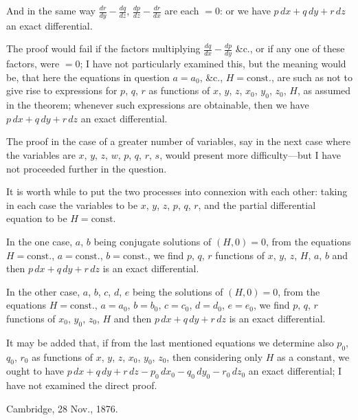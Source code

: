 \documentclass[11pt,a4paper]{book}
\begin{document}
And in the same way $\frac{dr}{dy} - \frac{dq}{dz}$, $\frac{dp}{dz} - \frac{dr}{dx}$ are each $= 0$: or we have $p\,dx + q\,dy + r\,dz$ an exact differential.

The proof would fail if the factors multiplying $\frac{dq}{dx} - \frac{dp}{dy}$ \&c., or if any one of these factors, were $= 0$; I have not particularly examined this, but the meaning would be, that here the equations in question $a = a_0$, \&c., $H = \text{const.}$, are such as not to give rise to expressions for $p$, $q$, $r$ as functions of $x$, $y$, $z$, $x_0$, $y_0$, $z_0$, $H$, as assumed in the theorem; whenever such expressions are obtainable, then we have $p\,dx + q\,dy + r\,dz$ an exact differential.

The proof in the case of a greater number of variables, say in the next case where the variables are $x$, $y$, $z$, $w$, $p$, $q$, $r$, $s$, would present more difficulty---but I have not proceeded further in the question.

It is worth while to put the two processes into connexion with each other: taking in each case the variables to be $x$, $y$, $z$, $p$, $q$, $r$, and the partial differential equation to be $H = \text{const.}$

In the one case, $a$, $b$ being conjugate solutions of $(H, 0) = 0$, from the equations $H = \text{const.}$, $a = \text{const.}$, $b = \text{const.}$, we find $p$, $q$, $r$ functions of $x$, $y$, $z$, $H$, $a$, $b$ and then $p\,dx + q\,dy + r\,dz$ is an exact differential.

In the other case, $a$, $b$, $c$, $d$, $e$ being the solutions of $(H, 0) = 0$, from the equations $H = \text{const.}$, $a = a_0$, $b = b_0$, $c = c_0$, $d = d_0$, $e = e_0$, we find $p$, $q$, $r$ functions of $x_0$, $y_0$, $z_0$, $H$ and then $p\,dx + q\,dy + r\,dz$ is an exact differential.

It may be added that, if from the last mentioned equations we determine also $p_0$, $q_0$, $r_0$ as functions of $x$, $y$, $z$, $x_0$, $y_0$, $z_0$, then considering only $H$ as a constant, we ought to have $p\,dx + q\,dy + r\,dz - p_0\,dx_0 - q_0\,dy_0 - r_0\,dz_0$ an exact differential; I have not examined the direct proof.

\begin{flushright}
Cambridge, 28 Nov., 1876.
\end{flushright}

\newpage
\end{document}
